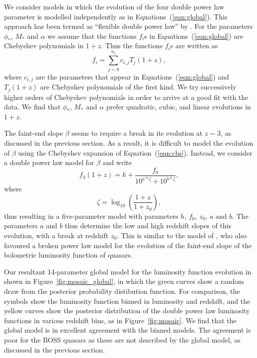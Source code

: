 \documentclass[a4paper,fleqn,usenatbib]{mnras}
\begin{document}
We consider models in which the evolution of the four double power law
parameter is modelled independently as in
Equations~(\ref{eqn:global}).  This approach has been termed as
``flexible double power law'' by \citet{2015MNRAS.451.1892A}.  For the
parameters $\phi_*$, $M_*$ and $\alpha$ we assume that the functions
$f_i$s in Equations~(\ref{eqn:global}) are Chebyshev polynomials in
$1+z$.  Thus the functions $f_i$s are written as
\begin{equation}
  f_i=\sum_{j=0}^{n_i}c_{i,j}T_j(1+z),
  \label{eqn:cbs}
\end{equation}
where $c_{i,j}$ are the parameters that appear in
Equations~(\ref{eqn:global}) and $T_j(1+z)$ are Chebyshev polynomials
of the first kind.  We try successively higher orders of Chebyshev
polynomials in order to arrive at a good fit with the data.  We find
that $\phi_*$, $M_*$ and $\alpha$ prefer quadratic, cubic, and linear
evolutions in $1+z$.

The faint-end slope $\beta$ seems to require a break in its evolution
at $z\sim 3$, as discussed in the previous section.  As a result, it
is difficult to model the evolution of $\beta$ using the Chebyshev
expansion of Equation~(\ref{eqn:cbs}).  Instead, we consider a double
power law model for $\beta$ and write
\begin{equation}
  f_3(1+z)=h+\frac{f_0}{10^{a*\zeta}+10^{b*\zeta}},
\end{equation}
where
\begin{equation}
  \zeta = \log_{10}\left(\frac{1+z}{1+z_0}\right),
\end{equation}
thus resulting in a five-parameter model with parameters $h$, $f_0$,
$z_0$, $a$ and $b$.  The parameters $a$ and $b$ thus determine the low
and high redshift slopes of this evolution, with a break at redshift
$z_0$.  This is similar to the model of \citet{2007ApJ...654..731H},
who also favoured a broken power law model for the evolution of the
faint-end slope of the bolometric luminosity function of quasars.

Our resultant 14-parameter global model for the luminosity function
evolution in shown in Figure~\ref{fig:mosaic_global}, in which the
green curves show a random draw from the posterior probability
distibution function.  For comparison, the symbols show the luminosity
function binned in luminosity and redshift, and the yellow curves show
the posterior distribution of the double power law luminosity
functions in various redshift bins, as in Figure~\ref{fig:mosaic}.  We
find that the global model is in excellent agreement with the binned
models.  The agreement is poor for the BOSS quasars as these are not
described by the global model, as discussed in the previous section.
\end{document}
